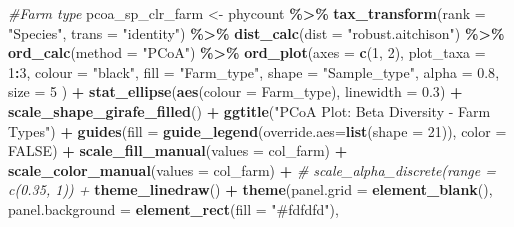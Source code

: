 \documentclass[
]{article}
\newenvironment{Shaded}{\begin{snugshade}}{\end{snugshade}}
\newcommand{\AttributeTok}[1]{\textcolor[rgb]{0.13,0.29,0.53}{#1}}
\newcommand{\CommentTok}[1]{\textcolor[rgb]{0.56,0.35,0.01}{\textit{#1}}}
\newcommand{\ConstantTok}[1]{\textcolor[rgb]{0.56,0.35,0.01}{#1}}
\newcommand{\DecValTok}[1]{\textcolor[rgb]{0.00,0.00,0.81}{#1}}
\newcommand{\FloatTok}[1]{\textcolor[rgb]{0.00,0.00,0.81}{#1}}
\newcommand{\FunctionTok}[1]{\textcolor[rgb]{0.13,0.29,0.53}{\textbf{#1}}}
\newcommand{\NormalTok}[1]{#1}
\newcommand{\OtherTok}[1]{\textcolor[rgb]{0.56,0.35,0.01}{#1}}
\newcommand{\SpecialCharTok}[1]{\textcolor[rgb]{0.81,0.36,0.00}{\textbf{#1}}}
\newcommand{\StringTok}[1]{\textcolor[rgb]{0.31,0.60,0.02}{#1}}
\begin{document}
\begin{Shaded}
\begin{Highlighting}[]
\CommentTok{\#Farm type}
\NormalTok{pcoa\_sp\_clr\_farm }\OtherTok{\textless{}{-}}
\NormalTok{  phycount }\SpecialCharTok{\%\textgreater{}\%}
 \FunctionTok{tax\_transform}\NormalTok{(}\AttributeTok{rank =} \StringTok{"Species"}\NormalTok{, }
               \AttributeTok{trans =} \StringTok{"identity"}\NormalTok{) }\SpecialCharTok{\%\textgreater{}\%}  
 \FunctionTok{dist\_calc}\NormalTok{(}\AttributeTok{dist =} \StringTok{"robust.aitchison"}\NormalTok{) }\SpecialCharTok{\%\textgreater{}\%}
 \FunctionTok{ord\_calc}\NormalTok{(}\AttributeTok{method =} \StringTok{"PCoA"}\NormalTok{) }\SpecialCharTok{\%\textgreater{}\%} 
 \FunctionTok{ord\_plot}\NormalTok{(}\AttributeTok{axes =} \FunctionTok{c}\NormalTok{(}\DecValTok{1}\NormalTok{, }\DecValTok{2}\NormalTok{),}
          \AttributeTok{plot\_taxa =} \DecValTok{1}\SpecialCharTok{:}\DecValTok{3}\NormalTok{,}
          \AttributeTok{colour =} \StringTok{"black"}\NormalTok{, }
          \AttributeTok{fill =} \StringTok{"Farm\_type"}\NormalTok{,}
          \AttributeTok{shape =} \StringTok{"Sample\_type"}\NormalTok{,}
          \AttributeTok{alpha =} \FloatTok{0.8}\NormalTok{,}
          \AttributeTok{size =} \DecValTok{5}
\NormalTok{          ) }\SpecialCharTok{+} 
  \FunctionTok{stat\_ellipse}\NormalTok{(}\FunctionTok{aes}\NormalTok{(}\AttributeTok{colour =}\NormalTok{ Farm\_type), }\AttributeTok{linewidth =} \FloatTok{0.3}\NormalTok{) }\SpecialCharTok{+}
  \FunctionTok{scale\_shape\_girafe\_filled}\NormalTok{() }\SpecialCharTok{+}
  \FunctionTok{ggtitle}\NormalTok{(}\StringTok{"PCoA Plot: Beta Diversity {-} Farm Types"}\NormalTok{) }\SpecialCharTok{+}
   \FunctionTok{guides}\NormalTok{(}\AttributeTok{fill =} \FunctionTok{guide\_legend}\NormalTok{(}\AttributeTok{override.aes=}\FunctionTok{list}\NormalTok{(}\AttributeTok{shape =} \DecValTok{21}\NormalTok{)),}
          \AttributeTok{color =} \ConstantTok{FALSE}\NormalTok{) }\SpecialCharTok{+}
  \FunctionTok{scale\_fill\_manual}\NormalTok{(}\AttributeTok{values =}\NormalTok{ col\_farm) }\SpecialCharTok{+}
  \FunctionTok{scale\_color\_manual}\NormalTok{(}\AttributeTok{values =}\NormalTok{ col\_farm) }\SpecialCharTok{+}
  \CommentTok{\# scale\_alpha\_discrete(range = c(0.35, 1)) +}
  \FunctionTok{theme\_linedraw}\NormalTok{() }\SpecialCharTok{+}
  \FunctionTok{theme}\NormalTok{(}\AttributeTok{panel.grid =} \FunctionTok{element\_blank}\NormalTok{(),}
        \AttributeTok{panel.background =} \FunctionTok{element\_rect}\NormalTok{(}\AttributeTok{fill =} \StringTok{"\#fdfdfd"}\NormalTok{),}

\end{Highlighting}
\end{Shaded}
\end{document}

